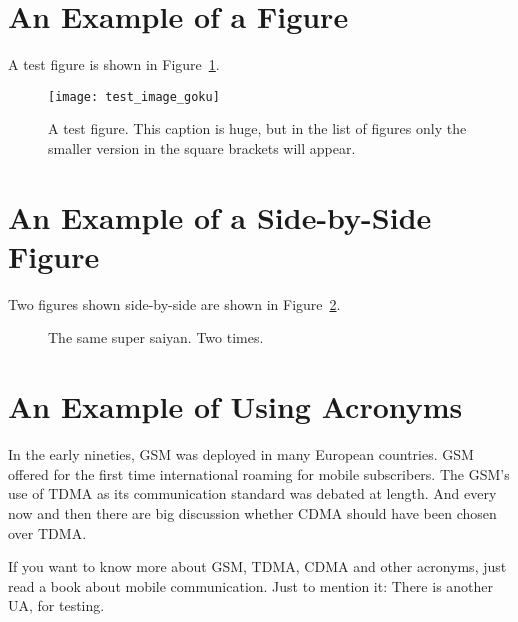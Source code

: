 \blindtext

\section{An Example of a Figure}

A test figure is shown in Figure~\ref{fig:test1}.

\begin{figure}[ht!] %
	\centering
	\texttt{[image: test\_image\_goku]}
	\caption[This is the short caption for List of Figures]{A test figure.  This caption is huge, but in the list of figures only the smaller version in the square brackets will appear.}
	\label{fig:test1}
\end{figure}

\blindtext

\section{An Example of a Side-by-Side Figure}

Two figures shown side-by-side are shown in Figure~\ref{fig:test2}.

\begin{figure}[!ht]
	\centering
	\qquad
	\caption[Short Caption]{The same super saiyan. Two times.}        
	\label{fig:test2}
\end{figure}

\blindtext

\section{An Example of Using Acronyms}

In the early nineties, \acs{GSM} was deployed in many European countries. \ac{GSM} offered for the first time international roaming for mobile subscribers. The \acs{GSM}’s use of \ac{TDMA} as its communication standard was debated at length. And every now and then there are big discussion whether \ac{CDMA} should have been chosen over \ac{TDMA}.

If you want to know more about \acf{GSM}, \acf{TDMA}, \acf{CDMA} and other acronyms, just read a book about mobile communication. Just to mention it: There is another \ac{UA}, for testing.

\blindtext

